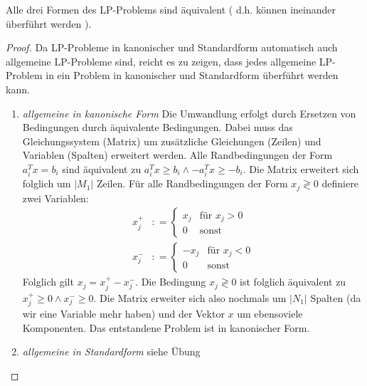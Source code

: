 \begin{theorem}
Alle drei Formen des LP-Problems sind äquivalent ( d.h. können ineinander überführt werden ).
\end{theorem}
\begin{proof}
Da LP-Probleme in kanonischer und Standardform automatisch auch allgemeine LP-Probleme sind, reicht es zu zeigen, dass jedes allgemeine LP-Problem in ein Problem in kanonischer und Standardform überführt werden kann.
\begin{enumerate}
\item{\textit{allgemeine in kanonische Form}} \newline
Die Umwandlung erfolgt durch Ersetzen von Bedingungen durch äquivalente Bedingungen. Dabei muss das Gleichungssystem (Matrix) um zusätzliche Gleichungen (Zeilen) und Variablen (Spalten) erweitert werden.
Alle Randbedingungen der Form $a_i^Tx = b_i$ sind äquivalent zu $a_i^Tx \geq b_i \land -a_i^Tx \geq -b_i$. Die Matrix erweitert sich folglich um $\lvert M_1 \rvert$ Zeilen. Für alle Randbedingungen der Form $x_j \gtrless 0$ definiere zwei Variablen:
\begin{align*}
 x_j^{+} &\colon= \begin{cases} %
x_j & \text{für } x_j > 0 \\
0 &\text{sonst}
\end{cases} \\
 x_j^{-} &\colon= \begin{cases} %
-x_j & \text{für } x_j < 0 \\
0 &\text{sonst}
\end{cases}
\end{align*}
Folglich gilt $x_j = x_j^{+} - x_j^{-}$. Die Bedingung $x_j \gtrless 0$ ist folglich äquivalent zu $x_j^{+} \geq 0 \land x_j^{-} \geq 0$. Die Matrix erweiter sich also nochmals um $\lvert N_1 \rvert$ Spalten (da wir eine Variable mehr haben) und der Vektor $x$ um ebensoviele Komponenten. Das entstandene Problem ist in kanonischer Form.
\item{\textit{allgemeine in Standardform}} \newline
siehe Übung
\end{enumerate}
\end{proof}

